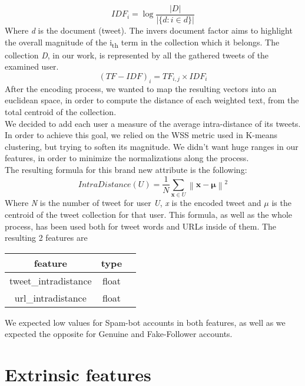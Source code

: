 \[ IDF_{i} =\log {\frac {|D|}{|\{d:i\in d\}|}} \]
Where \textit{d} is the document (tweet).
The invers document factor aims to highlight the overall magnitude of the  i\textsubscript{th} term in the collection  which it belongs. The collection \textit{D}, in our work, is represented by all the gathered tweets of the examined user.
\[(TF-IDF)_{i} = TF_{i,j} \times IDF_{i} \]
After the encoding process, we wanted to map the resulting vectors into an euclidean space, in order to compute the distance of each weighted text, from the total centroid of the collection.\\
We decided to add each user a measure of the average intra-distance of its tweets.\\
In order to achieve this goal, we relied on the WSS metric used in K-means clustering, but trying to soften its magnitude. We didn't want huge ranges in our features, in order to minimize the normalizations along the process.\\
The resulting formula for this brand new attribute is the following:
\[IntraDistance(U) = \frac{1}{N}\sum _{\mathbf {x} \in U}\left\|\mathbf {x} -{\boldsymbol {\mu }}\right\|^{2}\]
Where \textit{N} is the number of tweet for user \textit{U}, \textit{x} is the encoded tweet and $\mu$ is the centroid of the tweet collection for that user.
This formula, as well as the whole process, has been used both for tweet words and URLs inside of them.
The resulting 2 features are
\small
\begin{center}
	\begin{tabular}{ccc}
		\\feature&type\\
		\hline\hline
		tweet\_intradistance&float\\
		url\_intradistance&float\\
	\end{tabular}
\end{center}
\normalsize
We expected low values for Spam-bot accounts in both features, as well as we expected the opposite for Genuine and Fake-Follower accounts.


\section{Extrinsic features}

